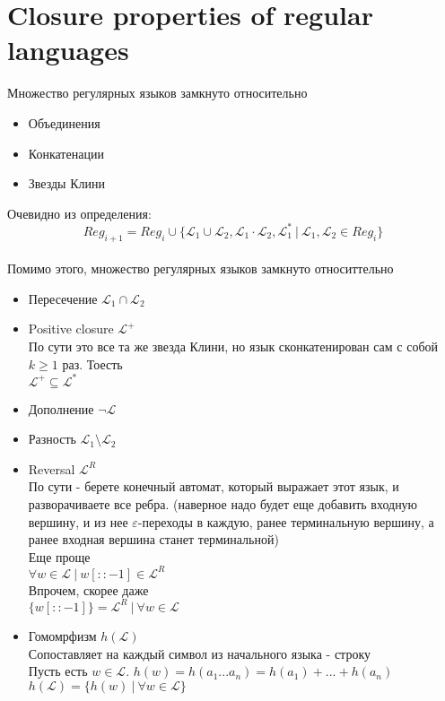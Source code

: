 \documentclass{article}
\begin{document}
	\section{Closure properties of regular languages}
	Множество регулярных языков замкнуто относительно
	\begin{itemize}
		\item Объединения
		\item Конкатенации
		\item Звезды Клини
	\end{itemize}
	Очевидно из определения:
	\[
	Reg_{i+1} = Reg_{i} \cup \{\mathcal{L}_1 \cup \mathcal{L}_2, \mathcal{L}_1 \cdot \mathcal{L}_2, \mathcal{L}^{*}_{1} \ | \ \mathcal{L}_1, \mathcal{L}_2 \in Reg_i\}\]\\
	Помимо этого, множество регулярных языков замкнуто относиттельно
	\begin{itemize}
		\item Пересечение \(\mathcal{L}_1 \cap \mathcal{L}_2\)
		\item Positive closure \(\mathcal{L}^+\)\\
		По сути это все та же звезда Клини, но язык сконкатенирован сам с собой \(k \geq 1\) раз. Тоесть\\
		\(\mathcal{L}^+ \subseteq \mathcal{L}^*\)
		\item Дополнение \(\neg \mathcal{L}\)
		\item Разность \(\mathcal{L}_1 \setminus \mathcal{L}_2\)
		\item Reversal \(\mathcal{L}^R\)\\
		По сути - берете конечный автомат, который выражает этот язык, и разворачиваете все ребра. (наверное надо будет еще добавить входную вершину, и из нее $\varepsilon$-переходы в каждую, ранее терминальную вершину, а ранее входная вершина станет терминальной)\\
		Еще проще\\
		\(\forall w \in \mathcal{L} \ | \ w[::-1] \in \mathcal{L}^R \)\\
		Впрочем, скорее даже\\
		\(\{w[::-1]\} = \mathcal{L}^R \ | \ \forall w \in \mathcal{L} \)
		\item Гомомрфизм \(h(\mathcal{L})\)\\
		Сопоставляет на каждый символ из начального языка - строку\\
		Пусть есть $w \in \mathcal{L}$. $h(w) = h(a_1...a_n) = h(a_1) + ... + h(a_n)$\\
		$h(\mathcal{L}) = \{h(w) \ | \ \forall w \in \mathcal{L}\}$

\end{itemize}
\end{document}
